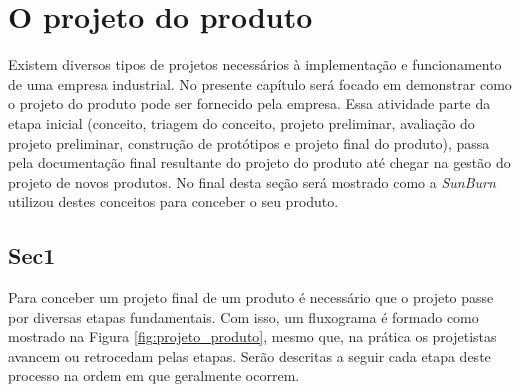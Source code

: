 \chapter{O projeto do produto} 
\label{chap:projeto_do_produto} 

Existem diversos tipos de projetos necessários à implementação e funcionamento de uma empresa industrial. No presente capítulo será focado em demonstrar como o projeto do produto pode ser fornecido pela empresa. Essa atividade parte da etapa inicial (conceito, triagem do conceito, projeto preliminar, avaliação do projeto preliminar, construção de protótipos e projeto final do produto), passa pela documentação final resultante do projeto do produto até chegar na gestão do projeto de novos produtos. No final desta seção será mostrado como a \textit{SunBurn} utilizou destes conceitos para conceber o seu produto.

\section{Sec1} 
\label{sec:projeto_do_produto_sec1} 

Para conceber um projeto final de um produto é necessário que o projeto passe por diversas etapas fundamentais. Com isso, um fluxograma é formado como mostrado na Figura \ref{fig:projeto_produto}, mesmo que, na prática os projetistas avancem ou retrocedam pelas etapas. Serão descritas a seguir cada etapa deste processo na ordem em que geralmente ocorrem.

